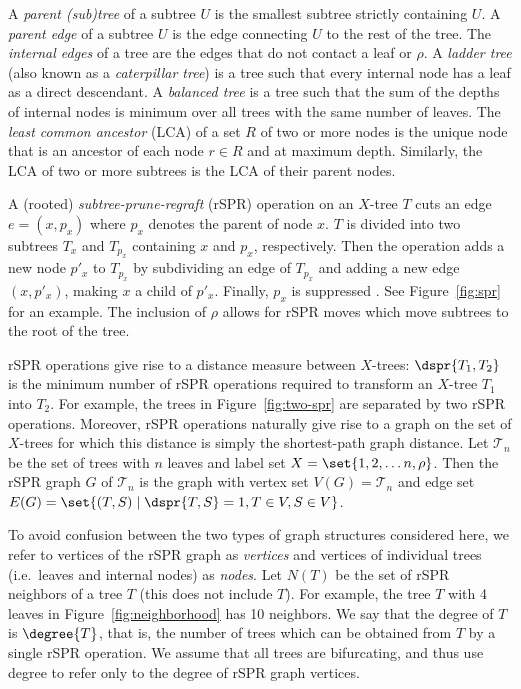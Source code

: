\documentclass[10pt,twoside,leqno,twocolumn]{article}
\newcommand{\cuttable}[2][]{%
    \ifthenelse{\equal{#1}{}}%
		{}%
		{#1}%
}
\begin{document}
A \emph{parent (sub)tree} of a subtree $U$ is the smallest subtree strictly containing $U$.
A \emph{parent edge} of a subtree $U$ is the edge connecting $U$ to the rest of the tree.
The \emph{internal edges} of a tree are the edges that do not contact a leaf or $\rho$.
A \emph{ladder tree} (also known as a \emph{caterpillar tree}) is a tree such that every internal node has a leaf as a direct descendant.
A \emph{balanced tree} is a tree such that the sum of the depths of internal nodes is minimum over all trees with the same number of leaves.
The \emph{least common ancestor} (LCA) of a set $R$ of two or more nodes is the unique node that is an ancestor of each node $r \in R$ and at maximum depth.
Similarly, the LCA of two or more subtrees is the LCA of their parent nodes.

A (rooted) \emph{subtree-prune-regraft} (rSPR) operation on an $X$-tree $T$ cuts an edge $e = (x, p_x)$ where $p_x$ denotes the parent of node $x$.
$T$ is divided into two subtrees $T_x$ and $T_{p_x}$ containing $x$ and $p_x$, respectively.
Then the operation adds a new node $p'_x$ to $T_{p_x}$ by subdividing an edge of $T_{p_x}$ and adding a new edge $(x, p'_x)$, making $x$ a child of $p'_x$.
Finally, $p_x$ is suppressed\cuttable{, joining the two edges on either side of that node}.
See Figure~\ref{fig:spr} for an example.
The inclusion of $\rho$ allows for rSPR moves which move subtrees to the root of the tree.

rSPR operations give rise to a distance measure between $X$-trees: $\dspr{T_1, T_2}$ is the minimum number of rSPR operations required to transform an $X$-tree $T_1$ into $T_2$.
For example, the trees in Figure~\ref{fig:two-spr} are separated by two rSPR operations.
Moreover, rSPR operations naturally give rise to a graph on the set of $X$-trees for which this distance is simply the shortest-path graph distance.
Let $\mathcal{T}_n$ be the set of trees with $n$ leaves and label set $X = \set{1, 2, \ldots n, \rho}$.
Then the rSPR graph $G$ of $\mathcal{T}_n$ is the graph with vertex set $V(G) = \mathcal{T}_n$ and edge set $E(G) = \set{(T,S) \mid \dspr{T,S} = 1, T \in V, S \in V}$.

To avoid confusion between the two types of graph structures considered here, we refer to vertices of the rSPR graph as \emph{vertices} and vertices of individual trees (i.e.\ leaves and internal nodes) as \emph{nodes}.
Let $N(T)$ be the set of rSPR neighbors of a tree $T$ (this does not include $T$).
For example, the tree $T$ with 4 leaves in Figure~\ref{fig:neighborhood} has 10 neighbors.
We say that the degree of $T$ is $\degree{T}$, that is, the number of trees which can be obtained from $T$ by a single rSPR operation.
We assume that all trees are bifurcating, and thus use degree to refer only to the degree of rSPR graph vertices.
\end{document}
